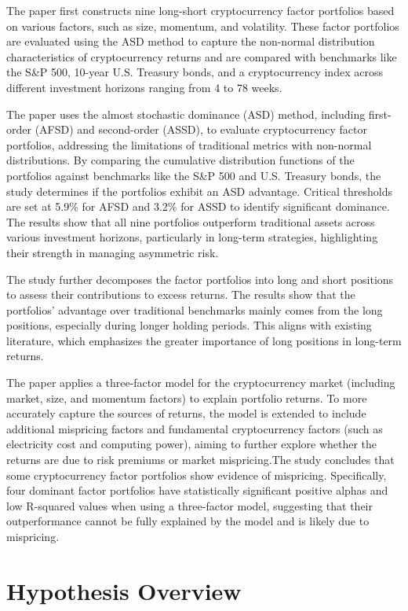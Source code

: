 \documentclass{article}
\begin{document}
The paper first constructs nine long-short cryptocurrency factor portfolios based on various factors, such as size, momentum, and volatility. These factor portfolios are evaluated using the ASD method to capture the non-normal distribution characteristics of cryptocurrency returns and are compared with benchmarks like the S\&P 500, 10-year U.S. Treasury bonds, and a cryptocurrency index across different investment horizons ranging from 4 to 78 weeks.

The paper uses the almost stochastic dominance (ASD) method, including first-order (AFSD) and second-order (ASSD), to evaluate cryptocurrency factor portfolios, addressing the limitations of traditional metrics with non-normal distributions. By comparing the cumulative distribution functions of the portfolios against benchmarks like the S\&P 500 and U.S. Treasury bonds, the study determines if the portfolios exhibit an ASD advantage. Critical thresholds are set at 5.9\% for AFSD and 3.2\% for ASSD to identify significant dominance. The results show that all nine portfolios outperform traditional assets across various investment horizons, particularly in long-term strategies, highlighting their strength in managing asymmetric risk.

The study further decomposes the factor portfolios into long and short positions to assess their contributions to excess returns. The results show that the portfolios' advantage over traditional benchmarks mainly comes from the long positions, especially during longer holding periods. This aligns with existing literature, which emphasizes the greater importance of long positions in long-term returns.

The paper applies a three-factor model for the cryptocurrency market (including market, size, and momentum factors) to explain portfolio returns. To more accurately capture the sources of returns, the model is extended to include additional mispricing factors and fundamental cryptocurrency factors (such as electricity cost and computing power), aiming to further explore whether the returns are due to risk premiums or market mispricing.The study concludes that some cryptocurrency factor portfolios show evidence of mispricing. Specifically, four dominant factor portfolios have statistically significant positive alphas and low R-squared values when using a three-factor model, suggesting that their outperformance cannot be fully explained by the model and is likely due to mispricing.

\hypertarget{hypothesis-overview}{%
\section{Hypothesis Overview}\label{hypothesis-overview}}
\end{document}
